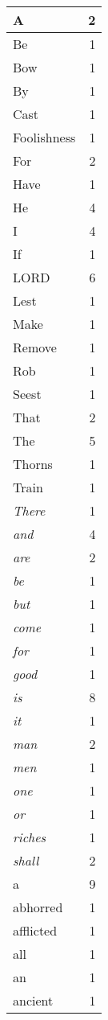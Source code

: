 \begin{center}
\begin{longtable}{l|r}
A & 2\\ \hline 
Be & 1\\ \hline 
Bow & 1\\ \hline 
By & 1\\ \hline 
Cast & 1\\ \hline 
Foolishness & 1\\ \hline 
For & 2\\ \hline 
Have & 1\\ \hline 
He & 4\\ \hline 
I & 4\\ \hline 
If & 1\\ \hline 
LORD & 6\\ \hline 
Lest & 1\\ \hline 
Make & 1\\ \hline 
Remove & 1\\ \hline 
Rob & 1\\ \hline 
Seest & 1\\ \hline 
That & 2\\ \hline 
The & 5\\ \hline 
Thorns & 1\\ \hline 
Train & 1\\ \hline 
\emph{There} & 1\\ \hline 
\emph{and} & 4\\ \hline 
\emph{are} & 2\\ \hline 
\emph{be} & 1\\ \hline 
\emph{but} & 1\\ \hline 
\emph{come} & 1\\ \hline 
\emph{for} & 1\\ \hline 
\emph{good} & 1\\ \hline 
\emph{is} & 8\\ \hline 
\emph{it} & 1\\ \hline 
\emph{man} & 2\\ \hline 
\emph{men} & 1\\ \hline 
\emph{one} & 1\\ \hline 
\emph{or} & 1\\ \hline 
\emph{riches} & 1\\ \hline 
\emph{shall} & 2\\ \hline 
a & 9\\ \hline 
abhorred & 1\\ \hline 
afflicted & 1\\ \hline 
all & 1\\ \hline 
an & 1\\ \hline 
ancient & 1\\ \hline 

\end{longtable}
\end{center}
